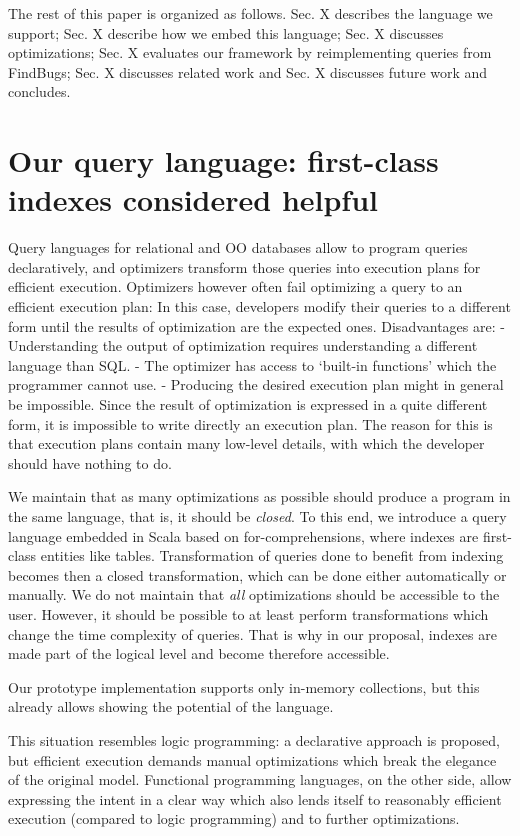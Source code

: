 \documentclass{article}
\begin{document}
The rest of this paper is organized as follows. Sec. X describes the
language we support; Sec. X describe how we embed this language; Sec. X
discusses optimizations; Sec. X evaluates our framework by
reimplementing queries from FindBugs; Sec. X discusses related work and
Sec. X discusses future work and concludes.

\section{Our query language: first-class indexes considered helpful}

Query languages for relational and OO databases allow to program queries
declaratively, and optimizers transform those queries into execution
plans for efficient execution. Optimizers however often fail optimizing
a query to an efficient execution plan: In this case, developers modify
their queries to a different form until the results of optimization are
the expected ones. Disadvantages are: - Understanding the output of
optimization requires understanding a different language than SQL. - The
optimizer has access to `built-in functions' which the programmer cannot
use. - Producing the desired execution plan might in general be
impossible. Since the result of optimization is expressed in a quite
different form, it is impossible to write directly an execution plan.
The reason for this is that execution plans contain many low-level
details, with which the developer should have nothing to do.

We maintain that as many optimizations as possible should produce a
program in the same language, that is, it should be \emph{closed}. To
this end, we introduce a query language embedded in Scala based on
for-comprehensions, where indexes are first-class entities like tables.
Transformation of queries done to benefit from indexing becomes then a
closed transformation, which can be done either automatically or
manually. We do not maintain that \emph{all} optimizations should be
accessible to the user. However, it should be possible to at least
perform transformations which change the time complexity of queries.
That is why in our proposal, indexes are made part of the logical level
and become therefore accessible.

Our prototype implementation supports only in-memory collections, but
this already allows showing the potential of the language.

 This situation resembles logic programming: a declarative approach is
proposed, but efficient execution demands manual optimizations which
break the elegance of the original model. Functional programming
languages, on the other side, allow expressing the intent in a clear way
which also lends itself to reasonably efficient execution (compared to
logic programming) and to further optimizations.
\end{document}
